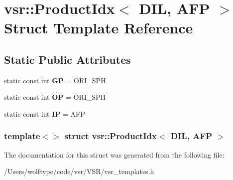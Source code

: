 \hypertarget{structvsr_1_1_product_idx_3_01_d_i_l_00_01_a_f_p_01_4}{\section{vsr\-:\-:Product\-Idx$<$ D\-I\-L, A\-F\-P $>$ Struct Template Reference}
\label{structvsr_1_1_product_idx_3_01_d_i_l_00_01_a_f_p_01_4}
}
\subsection*{Static Public Attributes}
\begin{DoxyCompactItemize}
\item 
\hypertarget{structvsr_1_1_product_idx_3_01_d_i_l_00_01_a_f_p_01_4_a8fda9d8aabaa5960e161ab1f75141fce}{static const int {\bfseries G\-P} = O\-R\-I\-\_\-\-S\-P\-H}\label{structvsr_1_1_product_idx_3_01_d_i_l_00_01_a_f_p_01_4_a8fda9d8aabaa5960e161ab1f75141fce}

\item 
\hypertarget{structvsr_1_1_product_idx_3_01_d_i_l_00_01_a_f_p_01_4_abff776a3988b60dd64b5f3bccaff9231}{static const int {\bfseries O\-P} = O\-R\-I\-\_\-\-S\-P\-H}\label{structvsr_1_1_product_idx_3_01_d_i_l_00_01_a_f_p_01_4_abff776a3988b60dd64b5f3bccaff9231}

\item 
\hypertarget{structvsr_1_1_product_idx_3_01_d_i_l_00_01_a_f_p_01_4_a15162ada0af908b5cdc270c2ba6891d7}{static const int {\bfseries I\-P} = A\-F\-P}\label{structvsr_1_1_product_idx_3_01_d_i_l_00_01_a_f_p_01_4_a15162ada0af908b5cdc270c2ba6891d7}

\end{DoxyCompactItemize}
\subsubsection*{template$<$$>$ struct vsr\-::\-Product\-Idx$<$ D\-I\-L, A\-F\-P $>$}



The documentation for this struct was generated from the following file\-:\begin{DoxyCompactItemize}
\item 
/\-Users/wolftype/code/vsr/\-V\-S\-R/vsr\-\_\-templates.\-h\end{DoxyCompactItemize}
